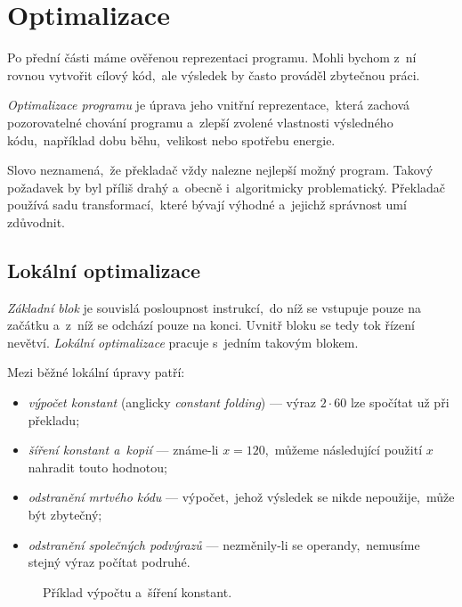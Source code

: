 \section{Optimalizace}\label{sec:optimalizace}

Po přední části máme ověřenou reprezentaci programu. Mohli bychom z~ní rovnou vytvořit cílový kód,~ale výsledek by často prováděl zbytečnou práci.

\emph{Optimalizace programu} je úprava jeho vnitřní reprezentace,~která zachová pozorovatelné chování programu a~zlepší zvolené vlastnosti výsledného kódu,~například dobu běhu,~velikost nebo spotřebu energie.

Slovo  neznamená,~že překladač vždy nalezne nejlepší možný program. Takový požadavek by byl příliš drahý a~obecně i~algoritmicky problematický. Překladač používá sadu transformací,~které bývají výhodné a~jejichž správnost umí zdůvodnit.

\subsection{Lokální optimalizace}

\emph{Základní blok} je souvislá posloupnost instrukcí,~do níž se vstupuje pouze na začátku a~z~níž se odchází pouze na konci. Uvnitř bloku se tedy tok řízení nevětví. \emph{Lokální optimalizace} pracuje s~jedním takovým blokem.

Mezi běžné lokální úpravy patří:
\begin{itemize}
    \item \emph{výpočet konstant} (anglicky \emph{constant folding}) --- výraz $2\cdot60$ lze spočítat už při překladu;
    \item \emph{šíření konstant a~kopií} --- známe-li $x=120$,~můžeme následující použití $x$ nahradit touto hodnotou;
    \item \emph{odstranění mrtvého kódu} --- výpočet,~jehož výsledek se nikde nepoužije,~může být zbytečný;
    \item \emph{odstranění společných podvýrazů} --- nezměnily-li se operandy,~nemusíme stejný výraz počítat podruhé.
\end{itemize}

\begin{figure}[h]
    \centering
    
    \caption{Příklad výpočtu a~šíření konstant.}
    \label{fig:optimalizace-konstant}
\end{figure}


